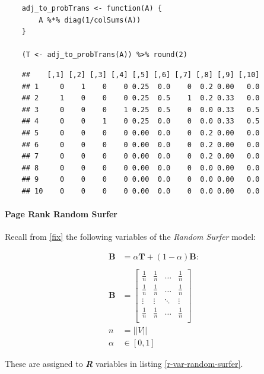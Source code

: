 \documentclass[11pt, twoside]{report}
\begin{document}
\begin{tcolorbox}
    \begin{verbatim}
    adj_to_probTrans <- function(A) {
        A %*% diag(1/colSums(A))
    }

    (T <- adj_to_probTrans(A)) %>% round(2)
    \end{verbatim}
\tcblower
    \begin{verbatim}
    ##    [,1] [,2] [,3] [,4] [,5] [,6] [,7] [,8] [,9] [,10]
    ## 1     0    1    0    0 0.25  0.0    0  0.2 0.00   0.0
    ## 2     1    0    0    0 0.25  0.5    1  0.2 0.33   0.0
    ## 3     0    0    0    1 0.25  0.5    0  0.0 0.33   0.5
    ## 4     0    0    1    0 0.25  0.0    0  0.0 0.33   0.5
    ## 5     0    0    0    0 0.00  0.0    0  0.2 0.00   0.0
    ## 6     0    0    0    0 0.00  0.0    0  0.2 0.00   0.0
    ## 7     0    0    0    0 0.00  0.0    0  0.2 0.00   0.0
    ## 8     0    0    0    0 0.00  0.0    0  0.0 0.00   0.0
    ## 9     0    0    0    0 0.00  0.0    0  0.0 0.00   0.0
    ## 10    0    0    0    0 0.00  0.0    0  0.0 0.00   0.0
    \end{verbatim}
\end{tcolorbox}

\paragraph{Page Rank Random Surfer}
\label{page-rank-random-surfer}
Recall from \ref{fix} the following variables of the \emph{Random Surfer} model:


\begin{align}
    \mathbf{B} &= \alpha \mathbf{T} +  \left( 1- \alpha \right)\mathbf{B} :\\
\ \\
    \mathbf{B}&= \begin{bmatrix}
    \frac{1}{n} & \frac{1}{n} & \ldots & \frac{1}{n} \\
    \frac{1}{n} & \frac{1}{n} & \ldots & \frac{1}{n} \\
        \vdots      & \vdots      & \ddots & \vdots  \\
    \frac{1}{n} & \frac{1}{n} & \ldots & \frac{1}{n} \\
    \end{bmatrix} \label{eq:bgval1} \\
    n&= \left| \left| V \right| \right| \\
    \alpha &\in [0,1]
\end{align}

These are
assigned to \emph{\textbf{R}} variables in listing \ref{r-var-random-surfer}.
\end{document}
